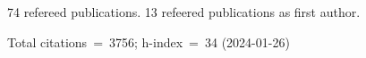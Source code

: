 74 refereed publications. 13 refeered publications as first author.

Total citations~=~3756; h-index~=~34 (2024-01-26)